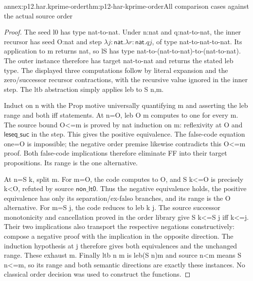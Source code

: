 \begin{annexitem}{annex:p12.har.kprime-order}{thm:p12-har-kprime-order}{All comparison cases against the actual source order}
\begin{proof}
The seed l0 has type nat-to-nat. Under n:nat and q:nat-to-nat,
the inner recursor has seed O:nat and step
\(\lambda j:\mathsf{nat}.\lambda r:\mathsf{nat}.q j\),
of type nat-to-nat-to-nat. Its application to m returns nat, so
lS has type nat-to-(nat-to-nat)-to-(nat-to-nat). The outer instance
therefore has target nat-to-nat and returns the stated leb type.
The displayed three computations follow by literal expansion and the
zero/successor recursor contractions, with the recursive value ignored
in the inner step. The ltb abstraction simply applies leb to S n,m.

Induct on n with the Prop motive universally quantifying m and asserting
the leb range and both iff statements. At n=O, leb O m computes to
one for every m. The source bound O<=m is proved by nat induction
on m: reflexivity at O and \(\mathsf{leseq\_suc}\) in the step. This gives the
positive equivalence. The false-code equation one=O is impossible;
the negative order premise likewise contradicts this O<=m proof.
Both false-code implications therefore eliminate FF into their target
propositions. Its range is the one alternative.

At n=S k, split m. For m=O, the code computes to O, and
S k<=O is precisely k<O, refuted by source \(\mathsf{non\_lt0}\). Thus the
negative equivalence holds, the positive equivalence has only its
separation/ex-falso branches, and its range is the O alternative.
For m=S j, the code reduces to leb k j. The source successor
monotonicity and cancellation proved in the order library give
S k<=S j iff k<=j. Their two implications also transport the respective
negations constructively: compose a negative proof with the implication
in the opposite direction. The induction hypothesis at j therefore
gives both equivalences and the unchanged range. These exhaust m.
Finally ltb n m is leb(S n)m and source n<m means S n<=m,
so its range and both semantic directions are exactly these instances.
No classical order decision was used to construct the functions.
\end{proof}
\end{annexitem}

